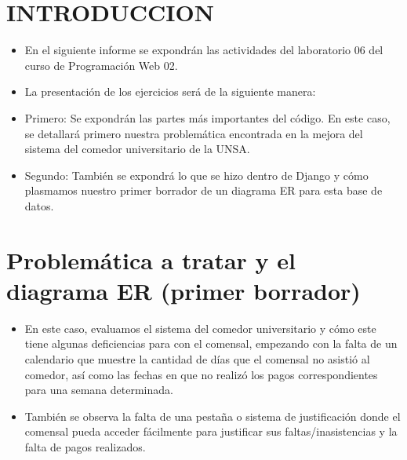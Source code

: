\documentclass{article}
\begin{document}
	
	
	
	
	\section{INTRODUCCION}
\begin{itemize}
    \item En el siguiente informe se expondrán las actividades del laboratorio 06 del curso de Programación Web 02.
    \item La presentación de los ejercicios será de la siguiente manera:
    \item Primero: Se expondrán las partes más importantes del código. En este caso, se detallará primero nuestra problemática encontrada en la mejora del sistema del comedor universitario de la UNSA.
    \item Segundo: También se expondrá lo que se hizo dentro de Django y cómo plasmamos nuestro primer borrador de un diagrama ER para esta base de datos.
\end{itemize}

\section{Problemática a tratar y el diagrama ER (primer borrador)}
\begin{itemize}
    \item En este caso, evaluamos el sistema del comedor universitario y cómo este tiene algunas deficiencias para con el comensal, empezando con la falta de un calendario que muestre la cantidad de días que el comensal no asistió al comedor, así como las fechas en que no realizó los pagos correspondientes para una semana determinada.
    \item También se observa la falta de una pestaña o sistema de justificación donde el comensal pueda acceder fácilmente para justificar sus faltas/inasistencias y la falta de pagos realizados.
\end{itemize}
\end{document}
